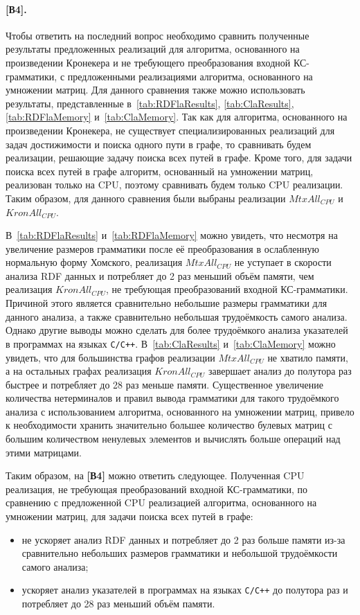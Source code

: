 \paragraph{[В4].} Чтобы ответить на последний вопрос необходимо сравнить полученные результаты предложенных реализаций для алгоритма, основанного на произведении Кронекера и не требующего преобразования входной КС-грамматики, с предложенными реализациями алгоритма, основанного на умножении матриц. Для данного сравнения также можно использовать результаты, представленные в~\cref{tab:RDFlaResults}, \cref{tab:ClaResults}, \cref{tab:RDFlaMemory} и~\cref{tab:ClaMemory}. Так как для алгоритма, основанного на произведении Кронекера, не существует специализированных реализаций для задач достижимости и поиска одного пути в графе, то сравнивать будем реализации, решающие задачу поиска всех путей в графе. Кроме того, для задачи поиска всех путей в графе алгоритм, основанный на умножении матриц, реализован только на CPU, поэтому сравнивать будем только CPU реализации. Таким образом, для данного сравнения были выбраны реализации $\textit{MtxAll}_{\textit{CPU}}$ и $\textit{KronAll}_{\textit{CPU}}$.

В~\cref{tab:RDFlaResults} и~\cref{tab:RDFlaMemory} можно увидеть, что несмотря на увеличение размеров грамматики после её преобразования в ослабленную нормальную форму Хомского, реализация $\textit{MtxAll}_{\textit{CPU}}$ не уступает в скорости анализа RDF данных и потребляет до 2 раз меньший объём памяти, чем реализация $\textit{KronAll}_{\textit{CPU}}$, не требующая преобразований входной КС-грамматики. Причиной этого является сравнительно небольшие размеры грамматики для данного анализа, а также сравнительно небольшая трудоёмкость самого анализа. Однако другие выводы можно сделать для более трудоёмкого анализа указателей в программах на языках \texttt{C/C++}. В~\cref{tab:ClaResults} и~\cref{tab:ClaMemory} можно увидеть, что для большинства графов реализации $\textit{MtxAll}_{\textit{CPU}}$ не хватило памяти, а на остальных графах реализация $\textit{KronAll}_{\textit{CPU}}$ завершает анализ до полутора раз быстрее и потребляет до 28 раз меньше памяти. Существенное увеличение количества нетерминалов и правил вывода грамматики для такого трудоёмкого анализа с использованием алгоритма, основанного на умножении матриц, привело к необходимости хранить значительно большее количество булевых матриц с большим количеством ненулевых элементов и вычислять больше операций над этими матрицами.

Таким образом, на \textbf{[В4]} можно ответить следующее. Полученная CPU реализация, не требующая преобразований входной КС-грамматики, по
сравнению с предложенной CPU реализацией алгоритма, основанного на умножении матриц, для задачи поиска всех путей в графе:
\begin{itemize}
    \item не ускоряет анализ RDF данных и потребляет до 2 раз больше памяти из-за сравнительно небольших размеров грамматики и небольшой трудоёмкости самого анализа;
    \item ускоряет анализ указателей в программах на языках \texttt{C/C++} до полутора раз и потребляет до 28 раз меньший объём памяти.
\end{itemize}


